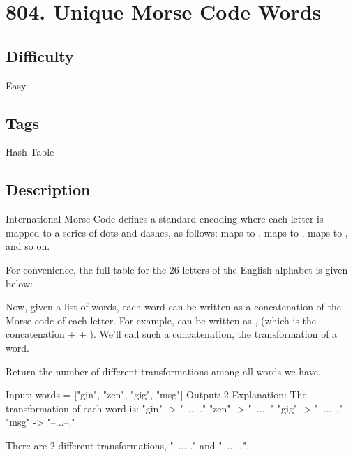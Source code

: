 \tocless\section{804. Unique Morse Code Words}
\label{algo:804}

\subsection*{Difficulty}
Easy

\subsection*{Tags}
Hash Table

\subsection*{Description}
International Morse Code defines a standard encoding where each letter is mapped to a series of dots and dashes, as follows:  maps to ,  maps to ,  maps to , and so on.

For convenience, the full table for the 26 letters of the English alphabet is given below:
\begin{multilinecode}
[".-", "-...", "-.-.", "-..", ".", "..-.", "--.", "....", "..", ".---", "-.-", ".-..", "--", "-.", "---", ".--.", "--.-", ".-.", "...", "-", "..-", "...-", ".--", "-..-", "-.--", "--.."]
\end{multilinecode}

Now, given a list of words, each word can be written as a concatenation of the Morse code of each letter. For example,  can be written as , (which is the concatenation  +  + ). We'll call such a concatenation, the transformation of a word.

Return the number of different transformations among all words we have.

\begin{example}
\begin{multilinecode}
Input: words = ["gin", "zen", "gig", "msg"]
Output: 2
Explanation:
The transformation of each word is:
"gin" -> "--...-."
"zen" -> "--...-."
"gig" -> "--...--."
"msg" -> "--...--."

There are 2 different transformations, "--...-." and "--...--.".
\end{multilinecode}
\end{example}

